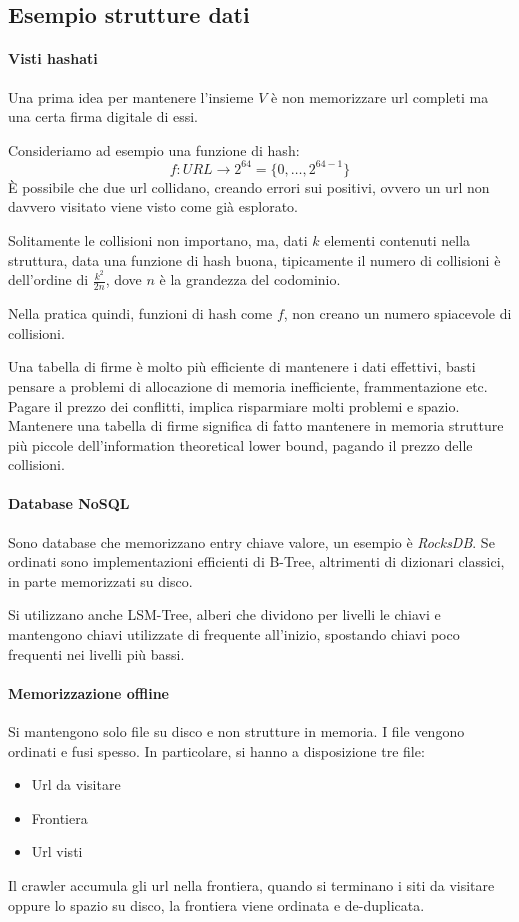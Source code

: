 \subsection{Esempio strutture dati}

\paragraph{Visti hashati}
Una prima idea per mantenere l'insieme $V$ è non memorizzare url completi ma una certa firma digitale 
di essi. 

Consideriamo ad esempio una funzione di hash:
$$f : \mathit{URL} \longrightarrow 2^{64} = \{0, \dots, 2^{64-1}\}$$
È possibile che due url collidano, creando errori sui positivi, ovvero un 
url non davvero visitato viene visto come già esplorato.

Solitamente le collisioni non importano, ma, dati $k$ elementi contenuti 
nella struttura, data una funzione di hash buona, tipicamente il numero di collisioni 
è dell'ordine di $\frac{k^2}{2n}$, dove $n$ è la grandezza del codominio. 

Nella pratica quindi, funzioni di hash come $f$, non creano un numero 
spiacevole di collisioni.
\begin{remark}
    Una tabella di firme è molto più efficiente di mantenere i dati effettivi, 
    basti pensare a problemi di allocazione di memoria inefficiente, frammentazione 
    etc.
    Pagare il prezzo dei conflitti, implica risparmiare molti problemi e spazio.\\
    Mantenere una tabella di firme significa di fatto mantenere in memoria strutture 
    più piccole dell'information theoretical lower bound, pagando il prezzo delle collisioni.
\end{remark}

\paragraph{Database NoSQL}
Sono  database che memorizzano entry chiave valore, 
un esempio è \emph{RocksDB}. Se ordinati sono implementazioni efficienti di B-Tree, 
altrimenti di dizionari classici, in parte memorizzati su disco. 

Si utilizzano anche LSM-Tree, alberi che dividono per livelli le chiavi e mantengono 
chiavi utilizzate di frequente all'inizio, spostando chiavi poco frequenti nei 
livelli più bassi.

\paragraph{Memorizzazione offline} 
Si mantengono solo file su disco e non strutture in memoria. 
I file vengono ordinati e fusi spesso. In particolare, si hanno a disposizione tre file: 
\begin{itemize}
    \item Url da visitare
    \item Frontiera
    \item Url visti 
\end{itemize}
Il crawler accumula gli url nella frontiera, quando si terminano i siti da visitare 
oppure lo spazio su disco, la frontiera viene ordinata e de-duplicata.

